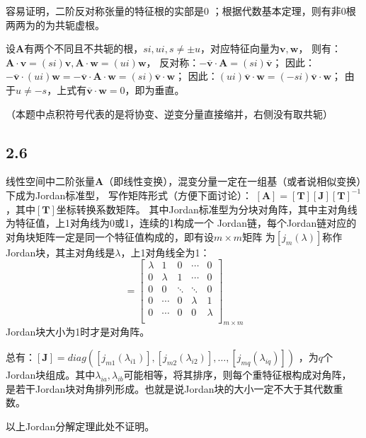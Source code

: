 \documentclass[UTF8,zihao=5]{ctexart}
\newcommand{\bm}[1]{{\mathbf{#1}}}
\newcommand{\conj}[1]{\overline{#1}}
\begin{document}
容易证明，二阶反对称张量的特征根的实部是0 %
；根据代数基本定理，则有非0根两两为的为共轭虚根。

设$\bm{A}$有两个不同且不共轭的根，$si, ui, s\neq\pm u$，对应特征向量为$\bm{v}, \bm{w}$，
则有：$\bm{A}\cdot\bm{v}=(si)\bm{v}, \bm{A}\cdot\bm{w}=(ui)\bm{w}$，
反对称：$-\conj{\bm{v}}\cdot\bm{A}=(si)\conj{\bm{v}}$；
因此：$-\conj{\bm{v}}\cdot(ui)\bm{w}=-\conj{\bm{v}}\cdot\bm{A}\cdot\bm{w}=(si)\conj{\bm{v}}\cdot\bm{w}$；
因此：$(ui)\conj{\bm{v}}\cdot\bm{w}=(-si)\conj{\bm{v}}\cdot\bm{w}$；
由于$u\neq-s$，上式有$\conj{\bm{v}}\cdot\bm{w}=0$，即为垂直。

（本题中点积符号代表的是将协变、逆变分量直接缩并，右侧没有取共轭）

\subsection*{2.6}

线性空间中二阶张量$\bm{A}$（即线性变换），混变分量一定在一组基（或者说相似变换）下成为Jordan标准型，
写作矩阵形式（方便下面讨论）：
$[\bm{A}]=[\bm{T}][\bm{J}][\bm{T}]^{-1}$，其中$[\bm{T}]$坐标转换系数矩阵。
其中Jordan标准型为分块对角阵，其中主对角线为特征值，上1对角线为0或1，连续的1构成一个
Jordan链，每个Jordan链对应的对角块矩阵一定是同一个特征值构成的，即有设$m\times m$矩阵
为$[j_m(\lambda)]$称作Jordan块，其主对角线是$\lambda$，上1对角线全为1：
\begin{equation}
    [j_m(\lambda)]=\begin{bmatrix}
        \lambda & 1       & 0      & \cdots  & 0       \\
        0       & \lambda & 1      & \cdots  & 0       \\
        0       & 0       & \ddots & \ddots  & 0       \\
        0       & \cdots  & 0      & \lambda & 1       \\
        0       & \cdots  & 0      & 0       & \lambda \\
    \end{bmatrix}_{m\times m}
\end{equation}
Jordan块大小为1时才是对角阵。

总有：$[\bm{J}]=diag([j_{m1}(\lambda_{i1})],[j_{m2}(\lambda_{i2})],\dots,[j_{mq}(\lambda_{iq})])$
，为$q$个Jordan块组成。其中$\lambda_{ia},\lambda_{ib}$可能相等，将其排序，则每个重特征根构成对角阵，
是若干Jordan块对角排列形成。也就是说Jordan块的大小一定不大于其代数重数。

以上Jordan分解定理此处不证明。
\end{document}
